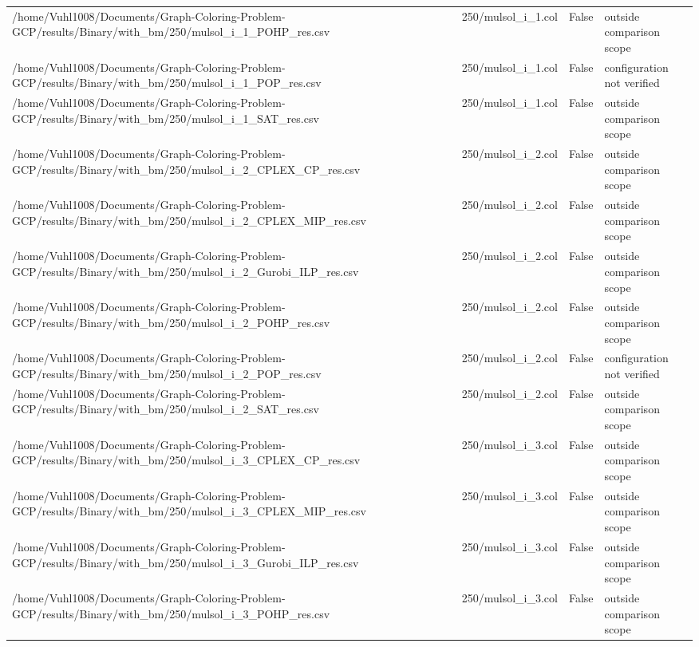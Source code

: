 \begin{table}[htbp]
\begin{tabular}{llll}
/home/Vuhl1008/Documents/Graph-Coloring-Problem-GCP/results/Binary/with\_bm/250/mulsol\_i\_1\_POHP\_res.csv & 250/mulsol\_i\_1.col & False & outside comparison scope \\
/home/Vuhl1008/Documents/Graph-Coloring-Problem-GCP/results/Binary/with\_bm/250/mulsol\_i\_1\_POP\_res.csv & 250/mulsol\_i\_1.col & False & configuration not verified \\
/home/Vuhl1008/Documents/Graph-Coloring-Problem-GCP/results/Binary/with\_bm/250/mulsol\_i\_1\_SAT\_res.csv & 250/mulsol\_i\_1.col & False & outside comparison scope \\
/home/Vuhl1008/Documents/Graph-Coloring-Problem-GCP/results/Binary/with\_bm/250/mulsol\_i\_2\_CPLEX\_CP\_res.csv & 250/mulsol\_i\_2.col & False & outside comparison scope \\
/home/Vuhl1008/Documents/Graph-Coloring-Problem-GCP/results/Binary/with\_bm/250/mulsol\_i\_2\_CPLEX\_MIP\_res.csv & 250/mulsol\_i\_2.col & False & outside comparison scope \\
/home/Vuhl1008/Documents/Graph-Coloring-Problem-GCP/results/Binary/with\_bm/250/mulsol\_i\_2\_Gurobi\_ILP\_res.csv & 250/mulsol\_i\_2.col & False & outside comparison scope \\
/home/Vuhl1008/Documents/Graph-Coloring-Problem-GCP/results/Binary/with\_bm/250/mulsol\_i\_2\_POHP\_res.csv & 250/mulsol\_i\_2.col & False & outside comparison scope \\
/home/Vuhl1008/Documents/Graph-Coloring-Problem-GCP/results/Binary/with\_bm/250/mulsol\_i\_2\_POP\_res.csv & 250/mulsol\_i\_2.col & False & configuration not verified \\
/home/Vuhl1008/Documents/Graph-Coloring-Problem-GCP/results/Binary/with\_bm/250/mulsol\_i\_2\_SAT\_res.csv & 250/mulsol\_i\_2.col & False & outside comparison scope \\
/home/Vuhl1008/Documents/Graph-Coloring-Problem-GCP/results/Binary/with\_bm/250/mulsol\_i\_3\_CPLEX\_CP\_res.csv & 250/mulsol\_i\_3.col & False & outside comparison scope \\
/home/Vuhl1008/Documents/Graph-Coloring-Problem-GCP/results/Binary/with\_bm/250/mulsol\_i\_3\_CPLEX\_MIP\_res.csv & 250/mulsol\_i\_3.col & False & outside comparison scope \\
/home/Vuhl1008/Documents/Graph-Coloring-Problem-GCP/results/Binary/with\_bm/250/mulsol\_i\_3\_Gurobi\_ILP\_res.csv & 250/mulsol\_i\_3.col & False & outside comparison scope \\
/home/Vuhl1008/Documents/Graph-Coloring-Problem-GCP/results/Binary/with\_bm/250/mulsol\_i\_3\_POHP\_res.csv & 250/mulsol\_i\_3.col & False & outside comparison scope \\

\end{tabular}
\end{table}
